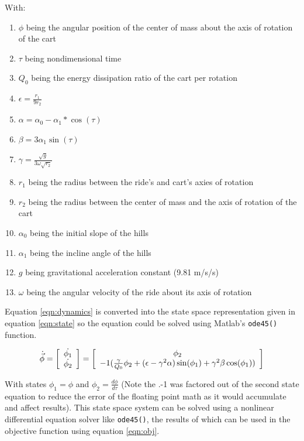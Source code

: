 \documentclass[11pt]{article}%
\begin{document}
With:
\begin{enumerate}
	\item $\phi$ being the angular position of the center of mass about the axis of rotation of the cart
	\item $\tau$ being nondimensional time
	\item $Q_{0}$ being the energy dissipation ratio of the cart per rotation
	\item $\epsilon=\frac{r_{1}}{9r_{2}}$
	\item $\alpha =\alpha_{0}-\alpha_{1}*\cos(\tau)$
	\item $\beta=3\alpha_{1}\sin(\tau)$
	\item $\gamma=\frac{\sqrt{g}}{3\omega\sqrt{r_{2}}}$
	\item $r_{1}$ being the radius between the ride's and cart's axies of rotation
	\item $r_{2}$ being the radius between the center of mass and the axis of rotation of the cart
	\item $\alpha_{0}$ being the initial slope of the hills
	\item $\alpha_{1}$ being the incline angle of the hills
	\item $g$ being gravitational acceleration constant (9.81 m/s/s)
	\item $\omega$ being the angular velocity of the ride about its axis of rotation
\end{enumerate}

Equation \ref{eqn:dynamics} is converted into the state space representation given in equation \ref{eqn:state} so the equation could be solved using Matlab's \lstinline{ode45()} function.

\begin{equation}
\label{eqn:state}
\dot{\vec{\phi}}= \left[\begin{array}
[c]{c}
\dot{\phi_{1}}\\
\dot{\phi_{2}}\end{array}\right] = \left[\begin{array}
[c]{c}
\phi_{2} \\
 -1(\frac{\gamma}{Q_{0}}\phi_{2}+(\epsilon-\gamma^{2}\alpha)\sin(\phi_{1})+\gamma^{2}\beta\cos(\phi_{1}))
 \end{array}\right]
 \end{equation}

With states $ \phi_{1}=\phi$ and $\phi_{2}=\frac{d\phi}{d\tau}$ (Note the .-1 was factored out of the second state equation to reduce the error of the floating point math as it would accumulate and affect results). This state space system can be solved using a nonlinear differential equation solver like \lstinline{ode45()}, the results of which can be used in the objective function using equation \ref{eqn:obj}.
\end{document}
